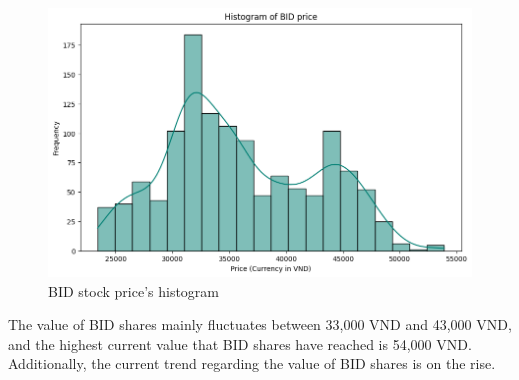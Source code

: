 \documentclass{ieeeojies}
\begin{document}
    \begin{figure}[H]
    \centering
    \begin{minipage}{0.23\textwidth}
        \centering
        \includegraphics[width=1\textwidth]{bibliography/Figure/BIDhist.png}
        \caption{BID stock price's histogram}
        \label{fig:3}
    \end{minipage}
\end{figure}
The value of BID shares mainly fluctuates between 33,000 VND and 43,000 VND, and the highest current value that BID shares have reached is 54,000 VND. Additionally, the current trend regarding the value of BID shares is on the rise.
\end{document}
